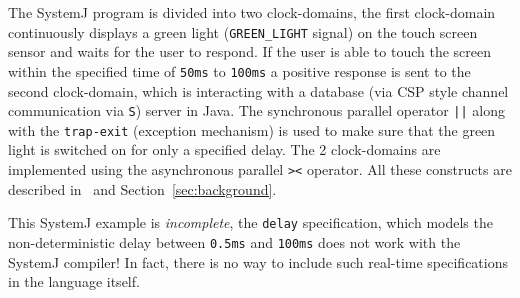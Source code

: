 The SystemJ program is divided into two clock-domains, the first
clock-domain continuously displays a green light (\texttt{GREEN\_LIGHT}
signal) on the touch screen sensor and waits for the user to respond. If
the user is able to touch the screen within the specified time of
\texttt{50ms} to \texttt{100ms} a positive response is sent to the
second clock-domain, which is interacting with a database (via CSP style
channel communication via \texttt{S}) server in Java. The synchronous
parallel operator \texttt{||} along with the \texttt{trap-exit}
(exception mechanism) is used to make sure that the green light is
switched on for only a specified delay. The 2 clock-domains are
implemented using the asynchronous parallel \texttt{><} operator. All
these constructs are described in~\cite{amal10} and
Section~\ref{sec:background}.

This SystemJ example is \textit{incomplete}, the \texttt{delay}
specification, which models the non-deterministic delay between
\texttt{0.5ms} and \texttt{100ms} does not work with the SystemJ compiler!
In fact, there is no way to include such real-time specifications in the
language itself.

